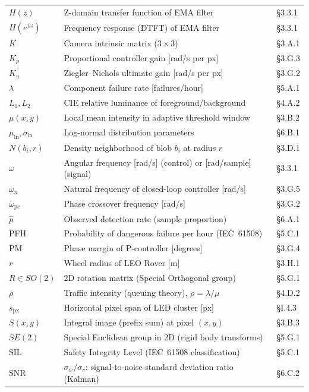 \begin{longtable}{@{}L{2.6cm}L{7.6cm}L{2.2cm}@{}}
$H(z)$ & Z-domain transfer function of EMA filter & \S3.3.1 \\
$H(e^{j\omega})$ & Frequency response (DTFT) of EMA filter & \S3.3.1 \\
$K$ & Camera intrinsic matrix ($3\times3$) & \S3.A.1 \\
$K_p$ & Proportional controller gain [rad/s per px] & \S 3.G.3 \\
$K_u$ & Ziegler--Nichols ultimate gain [rad/s per px] & \S 3.G.2 \\
$\lambda$ & Component failure rate [failures/hour] & \S5.A.1 \\
$L_1, L_2$ & CIE relative luminance of foreground/background & \S4.A.2 \\
$\mu(x,y)$ & Local mean intensity in adaptive threshold window & \S3.B.2 \\
$\mu_{\ln}, \sigma_{\ln}$ & Log-normal distribution parameters & \S6.B.1 \\
$N(b_i, r)$ & Density neighborhood of blob $b_i$ at radius $r$ & \S3.D.1 \\
$\omega$ & Angular frequency [rad/s] (control) or [rad/sample] (signal) & \S3.3.1 \\
$\omega_n$ & Natural frequency of closed-loop controller [rad/s] & \S 3.G.5 \\
$\omega_{\text{pc}}$ & Phase crossover frequency [rad/s] & \S 3.G.2 \\
$\hat p$ & Observed detection rate (sample proportion) & \S6.A.1 \\
PFH & Probability of dangerous failure per hour (IEC~61508) & \S5.C.1 \\
PM & Phase margin of P-controller [degrees] & \S 3.G.4 \\
$r$ & Wheel radius of LEO Rover [m] & \S3.H.1 \\
$R\in SO(2)$ & 2D rotation matrix (Special Orthogonal group) & \S5.G.1 \\
$\rho$ & Traffic intensity (queuing theory), $\rho=\lambda/\mu$ & \S4.D.2 \\
$s_{\text{px}}$ & Horizontal pixel span of LED cluster [px] & \S I.4.3 \\
$S(x,y)$ & Integral image (prefix sum) at pixel $(x,y)$ & \S3.B.3 \\
$SE(2)$ & Special Euclidean group in 2D (rigid body transforms) & \S5.G.1 \\
SIL & Safety Integrity Level (IEC~61508 classification) & \S5.C.1 \\
SNR & $\sigma_w/\sigma_v$: signal-to-noise standard deviation ratio (Kalman) & \S6.C.2 \\

\end{longtable}
